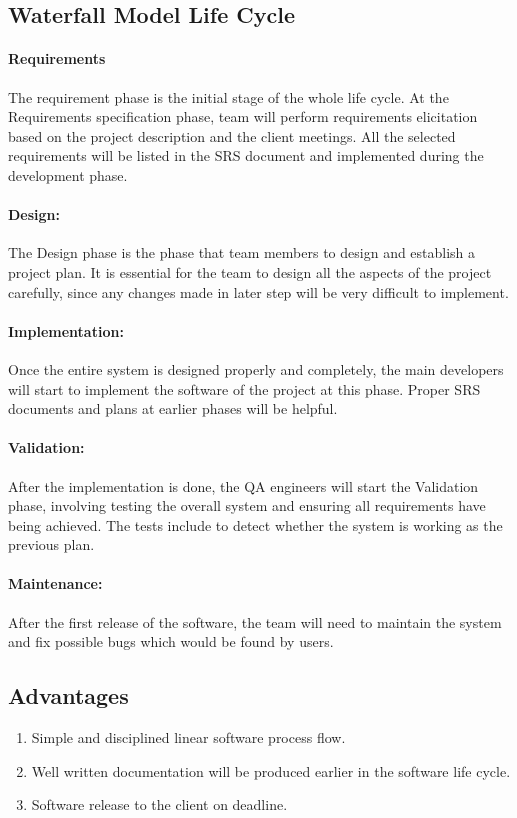 \documentclass[11pt, a4paper]{report}
\begin{document}
\subsection{Waterfall Model Life Cycle}
\paragraph{Requirements}
The requirement phase is the initial stage of the whole life cycle. At the Requirements specification phase, team will perform requirements elicitation based on the project description and the client meetings. All the selected requirements will be listed in the SRS document and implemented during the development phase.

\paragraph{Design:}
The Design phase is the phase that team members to design and establish a project plan. It is essential for the team to design all the aspects of the project carefully, since any changes made in later step will be very difficult to implement.

\paragraph{Implementation:}
Once the entire system is designed properly and completely, the main developers will start to implement the software of the project at this phase. Proper SRS documents and plans at earlier phases will be helpful. 

\paragraph{Validation:}
After the implementation is done, the QA engineers will start the Validation phase, involving testing the overall system and ensuring all requirements have being achieved. The tests include to detect whether the system is working as the previous plan.

\paragraph{Maintenance:}
After the first release of the software, the team will need to maintain the system and fix possible bugs which would be found by users.

\subsection{Advantages}
\begin{enumerate}
	\item  Simple and disciplined linear software process flow.
	\item  Well written documentation will be produced earlier in the software life cycle.
	\item  Software release to the client on deadline.
\end{enumerate}
\end{document}
